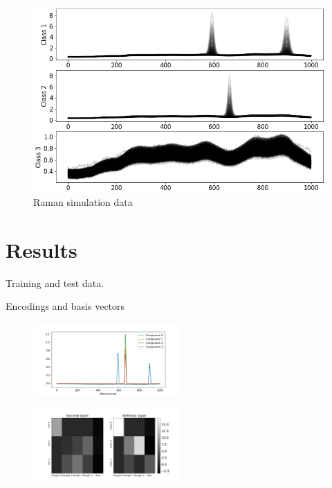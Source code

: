 \documentclass{article}
\begin{document}
\begin{figure}[!h]
	\centering
	\includegraphics[width=1\linewidth]{figures_3/raman_sim_training_data_2.png}  
	\caption{Raman simulation data}
\end{figure}



\section{Results}
\label{sec:results}

Training and test data. 

Encodings and basis vectors

\begin{figure}[!h]
  \includegraphics[width=0.5\textwidth]{figures_2/raman_sim_3_encode_layer_1_finetune_13.png}
\end{figure}

\begin{figure}[!h]
  \includegraphics[width=0.5\textwidth]{figures_2/raman_sim_second_softmax_encode.png}
\end{figure}
\end{document}

